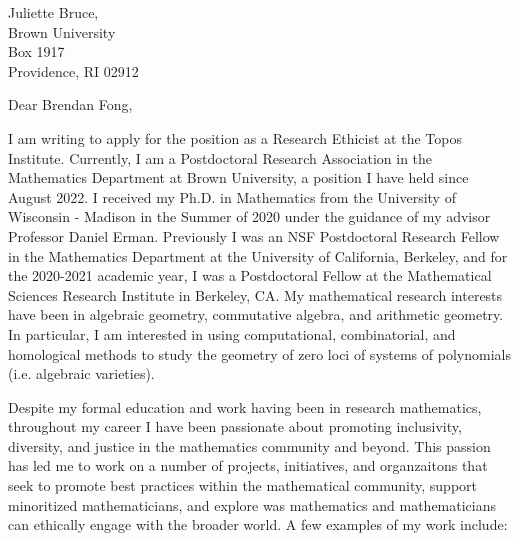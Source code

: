 \documentclass[11pt]{brownletter}
\date{April 24, 2022} %
\begin{document}
\begin{letter}{Juliette Bruce,\\ 
               Brown University\\ 
               Box 1917\\ 
               Providence, RI 02912}

\opening{Dear Brendan Fong,}

I am writing to apply for the position as a Research Ethicist at the Topos Institute. Currently, I am a Postdoctoral Research Association in the Mathematics Department at Brown University, a position I have held since August 2022. I received my Ph.D. in Mathematics from the University of Wisconsin - Madison in the Summer of 2020 under the guidance of my advisor Professor Daniel Erman. Previously I was an NSF Postdoctoral Research Fellow in the Mathematics Department at the University of California, Berkeley, and for the 2020-2021 academic year, I was a Postdoctoral Fellow at the Mathematical Sciences Research Institute in Berkeley, CA. My mathematical research interests have been in algebraic geometry, commutative algebra, and arithmetic geometry. In particular, I am interested in using computational, combinatorial, and homological methods to study the geometry of zero loci of systems of polynomials (i.e. algebraic varieties).  

Despite my formal education and work having been in research mathematics, throughout my career I have been passionate about promoting inclusivity, diversity, and justice in the mathematics community and beyond. This passion has led me to work on a number of projects, initiatives, and organzaitons that seek to promote best practices within the mathematical community, support minoritized mathematicians, and explore was mathematics and mathematicians can ethically engage with the broader world. A few examples of my work include: 


\end{letter}
\end{document}
